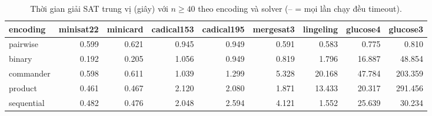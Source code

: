 \begin{table}[t]
\centering
\caption{Thời gian giải SAT trung vị (giây) với $n \geq 40$ theo encoding và solver (-- = mọi lần chạy đều timeout).}
\label{tab:enc_solver}
\begin{tabular}{lrrrrrrrr}
\toprule
encoding & minisat22 & minicard & cadical153 & cadical195 & mergesat3 & lingeling & glucose4 & glucose3 \\
\midrule
pairwise & 0.599 & 0.621 & 0.945 & 0.949 & 0.591 & 0.583 & 0.775 & 0.810 \\
binary & 0.192 & 0.205 & 1.056 & 0.949 & 0.819 & 1.796 & 16.887 & 48.854 \\
commander & 0.598 & 0.611 & 1.039 & 1.299 & 5.328 & 20.168 & 47.784 & 203.359 \\
product & 0.461 & 0.467 & 2.120 & 2.080 & 1.871 & 13.433 & 20.317 & 291.456 \\
sequential & 0.482 & 0.476 & 2.048 & 2.594 & 4.121 & 1.552 & 25.639 & 30.234 \\
\bottomrule
\end{tabular}
\end{table}
